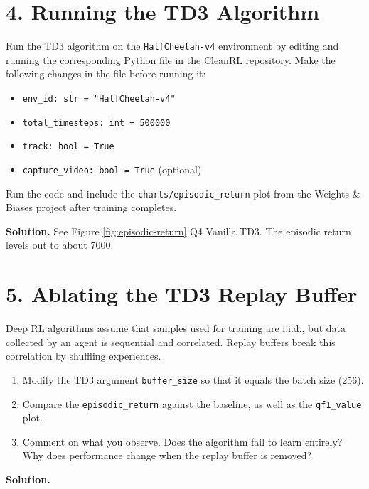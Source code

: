 \documentclass[11pt]{article}
\begin{document}
\section*{4. Running the TD3 Algorithm}
Run the TD3 algorithm on the \texttt{HalfCheetah-v4} environment by editing and running the corresponding Python file in the CleanRL repository. Make the following changes in the file before running it:
\begin{itemize}
    \item \texttt{env\_id: str = "HalfCheetah-v4"}
    \item \texttt{total\_timesteps: int = 500000}
    \item \texttt{track: bool = True}
    \item \texttt{capture\_video: bool = True} (optional)
\end{itemize}
Run the code and include the \texttt{charts/episodic\_return} plot from the Weights \& Biases project after training completes.

\textbf{Solution.} See Figure \ref{fig:episodic-return} Q4 Vanilla TD3. The episodic return levels out to about 7000.

\section*{5. Ablating the TD3 Replay Buffer}
Deep RL algorithms assume that samples used for training are i.i.d., but data collected by an agent is sequential and correlated. Replay buffers break this correlation by shuffling experiences.
\begin{enumerate}
    \item[(a)] Modify the TD3 argument \texttt{buffer\_size} so that it equals the batch size (256).
    \item[(b)] Compare the \texttt{episodic\_return} against the baseline, as well as the \texttt{qf1\_value} plot.
    \item[(c)] Comment on what you observe. Does the algorithm fail to learn entirely? Why does performance change when the replay buffer is removed?
\end{enumerate}

\textbf{Solution.}
\end{document}
